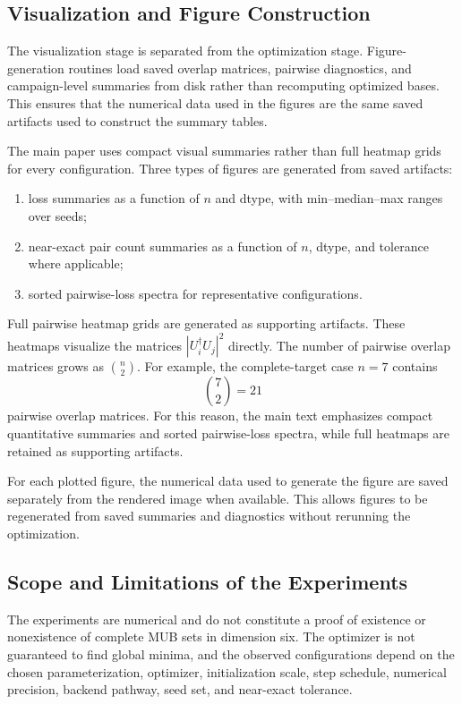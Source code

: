 \documentclass[a4paper,twocolumn,11pt,amsfonts,amssymb]{quantumarticle}
\begin{document}
\subsection{Visualization and Figure Construction}

The visualization stage is separated from the optimization stage. Figure-generation routines load saved overlap matrices, pairwise diagnostics, and campaign-level summaries from disk rather than recomputing optimized bases. This ensures that the numerical data used in the figures are the same saved artifacts used to construct the summary tables.

The main paper uses compact visual summaries rather than full heatmap grids for every configuration. Three types of figures are generated from saved artifacts:
\begin{enumerate}
    \item loss summaries as a function of \(n\) and dtype, with min--median--max ranges over seeds;
    \item near-exact pair count summaries as a function of \(n\), dtype, and tolerance where applicable;
    \item sorted pairwise-loss spectra for representative configurations.
\end{enumerate}

Full pairwise heatmap grids are generated as supporting artifacts. These heatmaps visualize the matrices \(|U_i^\dagger U_j|^2\) directly. The number of pairwise overlap matrices grows as \(\binom{n}{2}\). For example, the complete-target case \(n=7\) contains
\[
\binom{7}{2}=21
\]
pairwise overlap matrices. For this reason, the main text emphasizes compact quantitative summaries and sorted pairwise-loss spectra, while full heatmaps are retained as supporting artifacts.

For each plotted figure, the numerical data used to generate the figure are saved separately from the rendered image when available. This allows figures to be regenerated from saved summaries and diagnostics without rerunning the optimization.

\subsection{Scope and Limitations of the Experiments}

The experiments are numerical and do not constitute a proof of existence or nonexistence of complete MUB sets in dimension six. The optimizer is not guaranteed to find global minima, and the observed configurations depend on the chosen parameterization, optimizer, initialization scale, step schedule, numerical precision, backend pathway, seed set, and near-exact tolerance.
\end{document}
